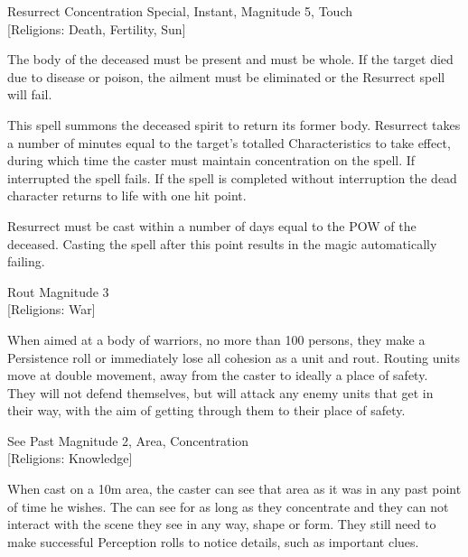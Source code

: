 \begin{samepage}
\begin{rpg-spell}
{Resurrect}
{Concentration Special, Instant, Magnitude 5, Touch\\{[Religions: Death, Fertility, Sun]}}

The body of the deceased must be present and must be whole. If the target died due to disease or poison, the ailment must be eliminated or the Resurrect spell will fail. 

This spell summons the deceased spirit to return its former body. Resurrect takes a number of minutes equal to the target’s totalled Characteristics to take effect, during which time the caster must maintain concentration on the spell. If interrupted the spell fails. If the spell is completed without interruption the dead character returns to life with one hit point.

Resurrect must be cast within a number of days equal to the POW of the deceased. Casting the spell after this point results in the magic automatically failing. 
\end{rpg-spell}
\end{samepage}

\begin{samepage}
\begin{rpg-spell}
{Rout}
{Magnitude 3\\{[Religions: War]}}

When aimed at a body of warriors, no more than 100 persons, they make a Persistence roll or immediately lose all cohesion as a unit and rout. Routing units move at double movement, away from the caster to ideally a place of safety.  They will not defend themselves, but will attack any enemy units that get in their way, with the aim of getting through them to their place of safety.  
\end{rpg-spell}
\end{samepage}

\begin{samepage}
\begin{rpg-spell}
{See Past}
{Magnitude 2, Area, Concentration\\{[Religions: Knowledge]}}

When cast on a 10m area, the caster can see that area as it was in any past point of time he wishes. The can see for as long as they concentrate and they can not interact with the scene they see in any way, shape or form. They still need to make successful Perception rolls to notice details, such as important clues.
\end{rpg-spell}
\end{samepage}

